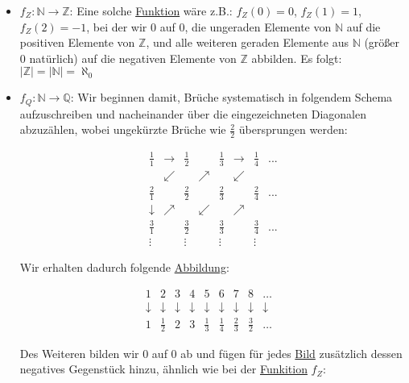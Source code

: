 \documentclass[../../main.tex]{subfiles}
\begin{document}
		\begin{itemize}
			\item $f_Z: \mathbb{N} \rightarrow \mathbb{Z}$: Eine solche \hyperref[def:Funktion]{Funktion} wäre z.B.: $f_Z(0) = 0$, $f_Z(1) = 1$, $f_Z(2)=-1$, bei der wir $0$ auf $0$, die ungeraden Elemente von $\mathbb{N}$ auf die positiven Elemente von $\mathbb{Z}$, und alle weiteren geraden Elemente aus $\mathbb{N}$ (größer $0$ natürlich) auf die negativen Elemente von $\mathbb{Z}$ abbilden. Es folgt: $|\mathbb{Z}| = |\mathbb{N}| = \aleph_0$
			\item $f_Q: \mathbb{N} \rightarrow \mathbb{Q}$: Wir beginnen damit, Brüche systematisch in folgendem Schema aufzuschreiben und nacheinander über die eingezeichneten Diagonalen abzuzählen, wobei ungekürzte Brüche wie $\frac{2}{2}$ übersprungen werden:
			
			$$			
			\begin{matrix}
			\frac{1}{1} & \rightarrow & \frac{1}{2} &          & \frac{1}{3} & \rightarrow & \frac{1}{4} & ... \\
					    & \swarrow    &             & \nearrow &             & \swarrow    &             &     \\
			\frac{2}{1} &             & \frac{2}{2} &          & \frac{2}{3} &             & \frac{2}{4} & ... \\
			\downarrow  & \nearrow    &             & \swarrow &             & \nearrow    &             &     \\
			\frac{3}{1} &             & \frac{3}{2} &          & \frac{3}{3} &             & \frac{3}{4} & ... \\
			\vdots      &             & \vdots      &          & \vdots      &             & \vdots      & 
 			\end{matrix}
			$$
			
			Wir erhalten dadurch folgende \hyperref[def:Abbildung]{Abbildung}:
	
			$$			
			\begin{matrix}
			1 & 2           & 3 & 4           & 5 & 6 & 7 & 8 & \dots \\
			\downarrow & \downarrow & \downarrow & \downarrow & \downarrow & \downarrow & \downarrow & \downarrow & \downarrow & \\
			1 & \frac{1}{2} & 2 & 3 & \frac{1}{3} & \frac{1}{4} & \frac{2}{3} & \frac{3}{2} & \dots
			\end{matrix}
			$$			
			
			Des Weiteren bilden wir 0 auf 0 ab und fügen für jedes \hyperref[def:Bild]{Bild} zusätzlich dessen negatives Gegenstück hinzu, ähnlich wie bei der \hyperref[def:Funktion]{Funkition} $f_Z$: 
			

\end{itemize}
\end{document}
